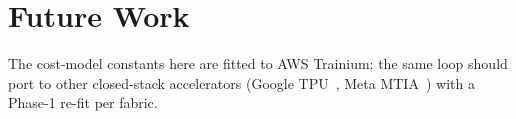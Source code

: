 \section{Future Work}
\label{sec:future}

The cost-model constants here are fitted to AWS Trainium; the
same loop should port to other closed-stack accelerators
(Google TPU~\cite{jouppi2023tpuv4,google_trillium_ga_2024}, Meta
MTIA~\cite{meta_mtia_scale_2026}) with a Phase-1 re-fit per
fabric.

